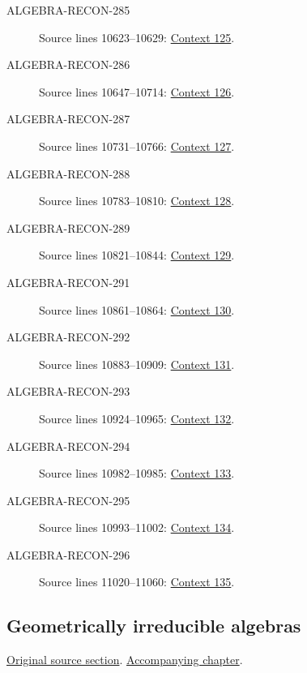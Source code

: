 \begin{description}
\item[ALGEBRA-RECON-285] Source lines 10623--10629: \hyperlink{algebra-context-125}{Context 125}.
\item[ALGEBRA-RECON-286] Source lines 10647--10714: \hyperlink{algebra-context-126}{Context 126}.
\item[ALGEBRA-RECON-287] Source lines 10731--10766: \hyperlink{algebra-context-127}{Context 127}.
\item[ALGEBRA-RECON-288] Source lines 10783--10810: \hyperlink{algebra-context-128}{Context 128}.
\item[ALGEBRA-RECON-289] Source lines 10821--10844: \hyperlink{algebra-context-129}{Context 129}.
\item[ALGEBRA-RECON-291] Source lines 10861--10864: \hyperlink{algebra-context-130}{Context 130}.
\item[ALGEBRA-RECON-292] Source lines 10883--10909: \hyperlink{algebra-context-131}{Context 131}.
\item[ALGEBRA-RECON-293] Source lines 10924--10965: \hyperlink{algebra-context-132}{Context 132}.
\item[ALGEBRA-RECON-294] Source lines 10982--10985: \hyperlink{algebra-context-133}{Context 133}.
\item[ALGEBRA-RECON-295] Source lines 10993--11002: \hyperlink{algebra-context-134}{Context 134}.
\item[ALGEBRA-RECON-296] Source lines 11020--11060: \hyperlink{algebra-context-135}{Context 135}.
\end{description}

\subsection{Geometrically irreducible algebras}
\hypertarget{algebra-source-section-algebras-over-fields}{}
\noindent\href{https://github.com/stacks/stacks-project/blob/a04446e57ec1fbc252a871afcec7752fb2807b14/algebra.tex\#L11073}{Original source section}. \href{algebra.pdf\#nameddest=section-algebras-over-fields}{Accompanying chapter}.

